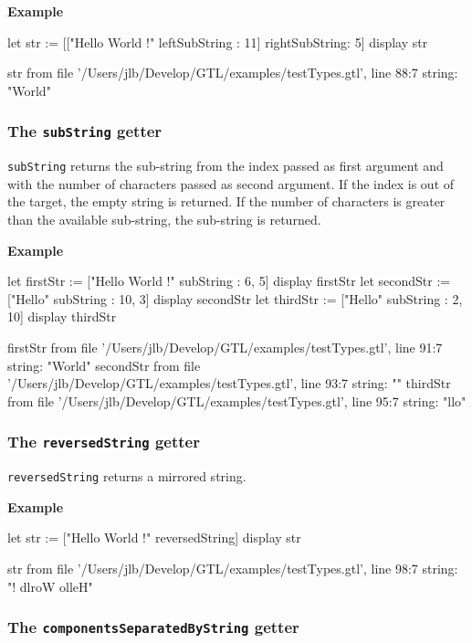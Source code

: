 \documentclass[10pt,openright,twosides,final]{memoir}
\newcommand{\gtlarg}[1]{{\footnotesize\ttfamily\colorbox{light-blue}{#1}}}
\newcommand{\gtlinline}[1]{\colorbox{light-blue}{\lstinline[language=gtl]{#1}}}
\newcommand{\example}{\vspace{.75em}\noindent\textbf{Example}\vspace{0em}}
\begin{document}
\example
\begin{gtl}
let str := [["Hello World !" leftSubString : 11] rightSubString: 5]
display str
\end{gtl}
\begin{console}
str from file '/Users/jlb/Develop/GTL/examples/testTypes.gtl', line 88:7
    string: "World"
\end{console}

\subsubsection{The \texttt{subString} getter}

\gtlinline{subString} returns the sub-string from the \gtlarg{index} passed as first argument and with the \gtlarg{number} of characters passed as second argument. If the \gtlarg{index} is out of the target, the empty string is returned. If the number of characters is greater than the available sub-string, the sub-string is returned. 

\example
\begin{gtl}
let firstStr := ["Hello World !" subString : 6, 5]
display firstStr
let secondStr := ["Hello" subString : 10, 3]
display secondStr
let thirdStr := ["Hello" subString : 2, 10]
display thirdStr
\end{gtl}
\begin{console}
firstStr from file '/Users/jlb/Develop/GTL/examples/testTypes.gtl', line 91:7
    string: "World"
secondStr from file '/Users/jlb/Develop/GTL/examples/testTypes.gtl', line 93:7
    string: ""
thirdStr from file '/Users/jlb/Develop/GTL/examples/testTypes.gtl', line 95:7
    string: "llo"
\end{console}

\subsubsection{The \texttt{reversedString} getter}

\gtlinline{reversedString} returns a mirrored string.

\example
\begin{gtl}
let str := ["Hello World !" reversedString]
display str
\end{gtl}
\begin{console}
str from file '/Users/jlb/Develop/GTL/examples/testTypes.gtl', line 98:7
    string: "! dlroW olleH"
\end{console}

\subsubsection{The \texttt{componentsSeparatedByString} getter}
\end{document}
